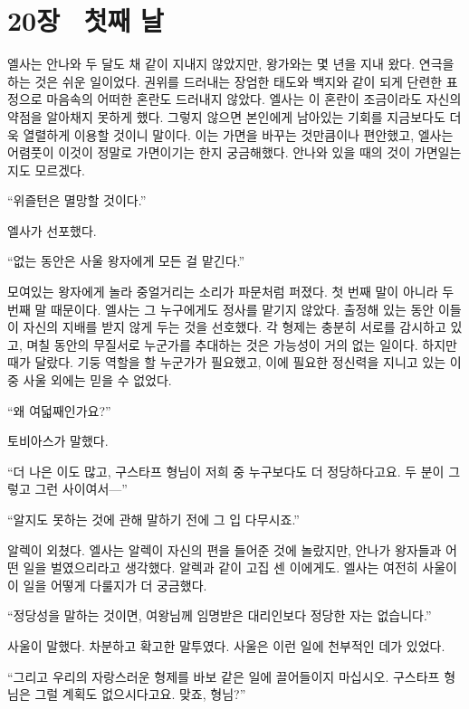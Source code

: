 

\chapter[20장  첫째 날][20장\hspace*{.5em}첫째 날]{20장 \ 첫째 날}



엘사는 안나와 두 달도 채 같이 지내지 않았지만, 왕가와는 몇 년을 지내 왔다. 연극을 하는 것은 쉬운 일이었다. 권위를 드러내는 장엄한 태도와 백지와 같이 되게 단련한 표정으로 마음속의 어떠한 혼란도 드러내지 않았다. 엘사는 이 혼란이 조금이라도 자신의 약점을 알아채지 못하게 했다. 그렇지 않으면 본인에게 남아있는 기회를 지금보다도 더욱 열렬하게 이용할 것이니 말이다. 이는 가면을 바꾸는 것만큼이나 편안했고, 엘사는 어렴풋이 이것이 정말로 가면이기는 한지 궁금해했다. 안나와 있을 때의 것이 가면일는지도 모르겠다.

``위즐턴은 멸망할 것이다.''

엘사가 선포했다.

``없는 동안은 사울 왕자에게 모든 걸 맡긴다.''

모여있는 왕자에게 놀라 중얼거리는 소리가 파문처럼 퍼졌다. 첫 번째 말이 아니라 두 번째 말 때문이다. 엘사는 그 누구에게도 정사를 맡기지 않았다. 출정해 있는 동안 이들이 자신의 지배를 받지 않게 두는 것을 선호했다. 각 형제는 충분히 서로를 감시하고 있고, 며칠 동안의 무질서로 누군가를 추대하는 것은 가능성이 거의 없는 일이다. 하지만 때가 달랐다. 기둥 역할을 할 누군가가 필요했고, 이에 필요한 정신력을 지니고 있는 이 중 사울 외에는 믿을 수 없었다.

``왜 여덟째인가요?''

토비아스가 말했다.

``더 나은 이도 많고, 구스타프 형님이 저희 중 누구보다도 더 정당하다고요. 두 분이 그렇고 그런 사이여서—''

``알지도 못하는 것에 관해 말하기 전에 그 입 다무시죠.''

알렉이 외쳤다. 엘사는 알렉이 자신의 편을 들어준 것에 놀랐지만, 안나가 왕자들과 어떤 일을 벌였으리라고 생각했다. 알렉과 같이 고집 센 이에게도. 엘사는 여전히 사울이 이 일을 어떻게 다룰지가 더 궁금했다.

``정당성을 말하는 것이면, 여왕님께 임명받은 대리인보다 정당한 자는 없습니다.''

사울이 말했다. 차분하고 확고한 말투였다. 사울은 이런 일에 천부적인 데가 있었다.

``그리고 우리의 자랑스러운 형제를 바보 같은 일에 끌어들이지 마십시오. 구스타프 형님은 그럴 계획도 없으시다고요. 맞죠, 형님?''

